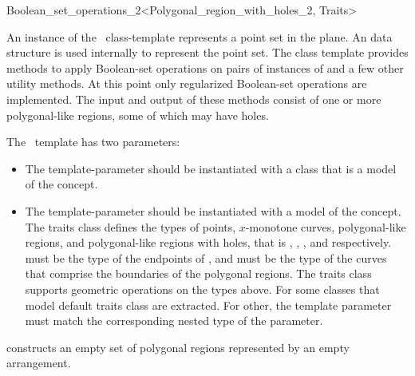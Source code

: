 \ccRefPageBegin

\begin{ccRefClass}{Boolean_set_operations_2<Polygonal_region_with_holes_2, Traits>}
    
\ccDefinition
An instance of the \ccClassTemplateName\ class-template represents a
point set in the plane. An  data structure is used
internally to represent the point set. The class template provides
methods to apply Boolean-set operations on pairs of instances of  
 and a few other utility methods. At this
point only regularized Boolean-set operations are implemented.
The input and output of these methods consist of one or more
polygonal-like regions, some of which may have holes.

The \ccClassTemplateName\ template has two parameters:
\begin{itemize}
\item The  template-parameter should
be instantiated with a class that is a model of the
 concept.
\item The  template-parameter should be instantiated with
a model of the  concept. The traits
class defines the types of points, $x$-monotone curves, polygonal-like
regions, and polygonal-like regions with holes, that is ,
, , and
 respectively.  must
be the type of the endpoints of , and
 must be the type of the curves that comprise
the boundaries of the polygonal regions. The traits class supports
geometric operations on the types above. For some classes that model
 default traits class are
extracted. For other, the template parameter
 must match the corresponding
nested type of the  parameter.
\end{itemize}

\ccTypes
\ccGlue
{} 


\ccCreation
{}
    
  {constructs an empty set of polygonal regions represented by an
  empty arrangement.}
    

\end{ccRefClass}
